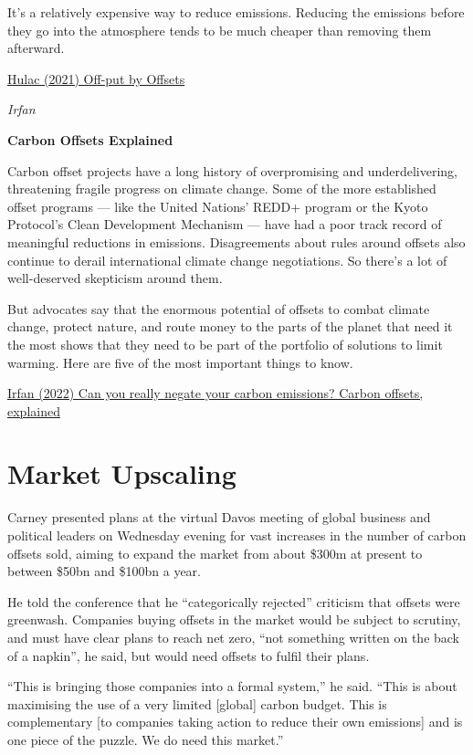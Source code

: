 \documentclass[
]{book}
\begin{document}
It's a relatively expensive way to reduce emissions. Reducing the emissions before they go into the atmosphere tends to be much cheaper than removing them afterward.

\href{https://www.rollcall.com/2021/05/05/off-put-by-offsets-why-some-advocates-doubt-net-zero-pledges/}{Hulac (2021) Off-put by Offsets}

\emph{Irfan}

\textbf{Carbon Offsets Explained}

Carbon offset projects have a long history of overpromising and underdelivering, threatening fragile progress on climate change. Some of the more established offset programs --- like the United Nations' REDD+ program or the Kyoto Protocol's Clean Development Mechanism --- have had a poor track record of meaningful reductions in emissions. Disagreements about rules around offsets also continue to derail international climate change negotiations. So there's a lot of well-deserved skepticism around them.

But advocates say that the enormous potential of offsets to combat climate change, protect nature, and route money to the parts of the planet that need it the most shows that they need to be part of the portfolio of solutions to limit warming. Here are five of the most important things to know.

\href{https://www.vox.com/2020/2/27/20994118/carbon-offset-climate-change-net-zero-neutral-emissions}{Irfan (2022) Can you really negate your carbon emissions? Carbon offsets, explained}

\hypertarget{market-upscaling}{%
\section{Market Upscaling}\label{market-upscaling}}

Carney presented plans at the virtual Davos meeting of global business and political leaders on Wednesday evening for vast increases in the number of carbon offsets sold, aiming to expand the market from about \$300m at present to between \$50bn and \$100bn a year.

He told the conference that he ``categorically rejected'' criticism that offsets were greenwash. Companies buying offsets in the market would be subject to scrutiny, and must have clear plans to reach net zero, ``not something written on the back of a napkin'', he said, but would need offsets to fulfil their plans.

``This is bringing those companies into a formal system,'' he said. ``This is about maximising the use of a very limited {[}global{]} carbon budget. This is complementary {[}to companies taking action to reduce their own emissions{]} and is one piece of the puzzle. We do need this market.''
\end{document}
